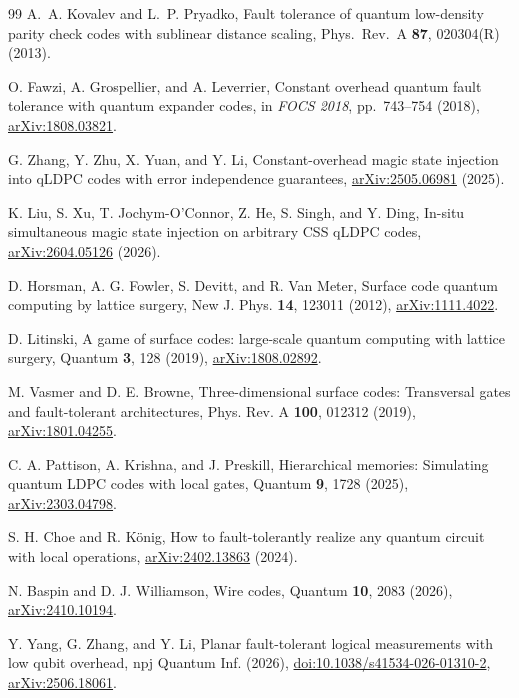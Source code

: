\begin{thebibliography}{99}
A.~A. Kovalev and L.~P. Pryadko, Fault tolerance of quantum low-density parity check codes with sublinear distance scaling, Phys.\ Rev.\ A \textbf{87}, 020304(R) (2013).

O. Fawzi, A. Grospellier, and A. Leverrier, Constant overhead quantum fault tolerance with quantum expander codes, in \emph{FOCS 2018}, pp.\ 743--754 (2018), \href{https://arxiv.org/abs/1808.03821}{arXiv:1808.03821}.

G. Zhang, Y. Zhu, X. Yuan, and Y. Li, Constant-overhead magic state injection into qLDPC codes with error independence guarantees, \href{https://arxiv.org/abs/2505.06981}{arXiv:2505.06981} (2025).

K. Liu, S. Xu, T. Jochym-O'Connor, Z. He, S. Singh, and Y. Ding, In-situ simultaneous magic state injection on arbitrary CSS qLDPC codes, \href{https://arxiv.org/abs/2604.05126}{arXiv:2604.05126} (2026).

D. Horsman, A. G. Fowler, S. Devitt, and R. Van Meter, Surface code quantum computing by lattice surgery, New J. Phys. \textbf{14}, 123011 (2012), \href{https://arxiv.org/abs/1111.4022}{arXiv:1111.4022}.

D. Litinski, A game of surface codes: large-scale quantum computing with lattice surgery, Quantum \textbf{3}, 128 (2019), \href{https://arxiv.org/abs/1808.02892}{arXiv:1808.02892}.

M. Vasmer and D. E. Browne, Three-dimensional surface codes: Transversal gates and fault-tolerant architectures, Phys. Rev. A \textbf{100}, 012312 (2019), \href{https://arxiv.org/abs/1801.04255}{arXiv:1801.04255}.

C. A. Pattison, A. Krishna, and J. Preskill, Hierarchical memories: Simulating quantum LDPC codes with local gates, Quantum \textbf{9}, 1728 (2025), \href{https://arxiv.org/abs/2303.04798}{arXiv:2303.04798}.

S. H. Choe and R. K\"onig, How to fault-tolerantly realize any quantum circuit with local operations, \href{https://arxiv.org/abs/2402.13863}{arXiv:2402.13863} (2024).

N. Baspin and D. J. Williamson, Wire codes, Quantum \textbf{10}, 2083 (2026), \href{https://arxiv.org/abs/2410.10194}{arXiv:2410.10194}.

Y. Yang, G. Zhang, and Y. Li, Planar fault-tolerant logical measurements with low qubit overhead, npj Quantum Inf. (2026), \href{https://doi.org/10.1038/s41534-026-01310-2}{doi:10.1038/s41534-026-01310-2}, \href{https://arxiv.org/abs/2506.18061}{arXiv:2506.18061}.


\end{thebibliography}
